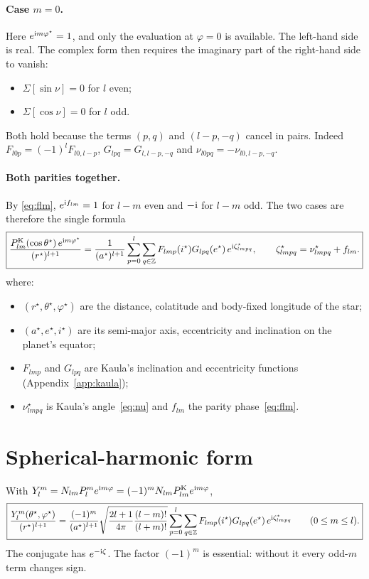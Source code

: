 \paragraph{Case $m=0$.} Here $e^{\mathrm{i} m\varphi^\star}=1$, and only the evaluation at $\varphi=0$ is available. The left-hand side is real. The complex form then requires the imaginary part of the right-hand side to vanish:
\begin{itemize}
  \item $\Sigma[\sin\nu]=0$ for $l$ even;
  \item $\Sigma[\cos\nu]=0$ for $l$ odd.
\end{itemize}
Both hold because the terms $(p,q)$ and $(l-p,-q)$ cancel in pairs. Indeed $F_{l0p}=(-1)^lF_{l0,l-p}$, $G_{lpq}=G_{l,l-p,-q}$ and $\nu_{l0pq}=-\nu_{l0,l-p,-q}$.

\paragraph{Both parities together.} By \eqref{eq:flm}, $e^{\mathrm{i} f_{lm}}=1$ for $l-m$ even and $-\mathrm{i}$ for $l-m$ odd. The two cases are therefore the single formula
\begin{equation}
  \boxed{\frac{P^{\mathrm K}_{lm}(\cos\theta^\star)\,e^{\mathrm{i} m\varphi^\star}}{(r^\star)^{l+1}}=\frac{1}{(a^\star)^{l+1}}\sum_{p=0}^{l}\sum_{q\in\mathbb Z}F_{lmp}(i^\star)G_{lpq}(e^\star)\,e^{\mathrm{i}\zeta^\star_{lmpq}},\qquad \zeta^\star_{lmpq}=\nu^\star_{lmpq}+f_{lm}.} \label{eq:kaula-complex}
\end{equation}
where:
\begin{itemize}
  \item $(r^\star,\theta^\star,\varphi^\star)$ are the distance, colatitude and body-fixed longitude of the star;
  \item $(a^\star,e^\star,i^\star)$ are its semi-major axis, eccentricity and inclination on the planet's equator;
  \item $F_{lmp}$ and $G_{lpq}$ are Kaula's inclination and eccentricity functions (Appendix~\ref{app:kaula});
  \item $\nu^\star_{lmpq}$ is Kaula's angle~\eqref{eq:nu} and $f_{lm}$ the parity phase~\eqref{eq:flm}.
\end{itemize}

\section{Spherical-harmonic form}
With $Y_l^m=N_{lm}P_l^me^{\mathrm{i} m\varphi}=(-1)^mN_{lm}P^{\mathrm K}_{lm}e^{\mathrm{i} m\varphi}$,
\begin{equation}
  \boxed{\frac{Y_l^m(\theta^\star,\varphi^\star)}{(r^\star)^{l+1}}=\frac{(-1)^m}{(a^\star)^{l+1}}\sqrt{\frac{2l+1}{4\pi}\frac{(l-m)!}{(l+m)!}}\sum_{p=0}^{l}\sum_{q\in\mathbb Z}F_{lmp}(i^\star)G_{lpq}(e^\star)\,e^{\mathrm{i}\zeta^\star_{lmpq}}\qquad(0\le m\le l).} \label{eq:kaula-Ylm}
\end{equation}
The conjugate has $e^{-\mathrm{i}\zeta}$. The factor $(-1)^m$ is essential: without it every odd-$m$ term changes sign.

